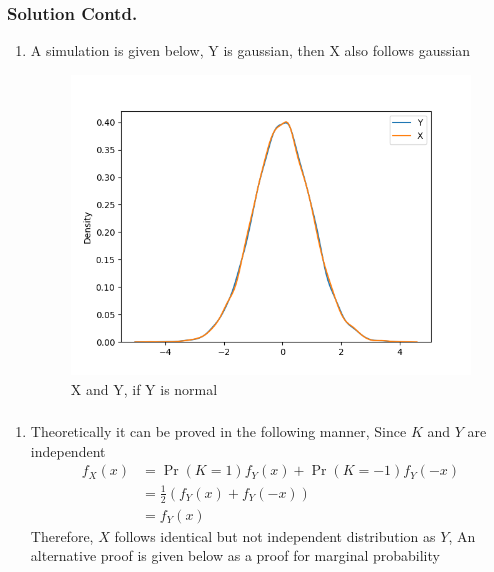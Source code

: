 \documentclass{beamer}
\providecommand{\pr}[1]{\ensuremath{\Pr\left(#1\right)}}
\providecommand{\brak}[1]{\ensuremath{\left(#1\right)}}
\begin{document}
\begin{frame}
\frametitle{Solution Contd.}
\begin{enumerate}
\item
A simulation is given below, Y is gaussian, then X also follows gaussian
\begin{figure}[H]
\centering
\includegraphics[width=.75\linewidth]{figure/fig}
\caption{X and Y, if Y is normal}
\label{plot}
\end{figure}
\end{enumerate}
\end{frame}

\begin{frame}
\frametitle{}
\begin{enumerate}\item
    Theoretically it can be proved in the following manner,
Since $K$ and $Y$ are independent
\begin{align}
f_X(x)&=\pr{K=1}f_Y(x)+\pr{K=-1}f_Y(-x)\\
&=\frac{1}{2}\brak{f_Y(x)+f_Y(-x)}\\
&=f_Y(x)
\end{align}
Therefore, $X$ follows identical but not independent distribution as $Y$, An alternative proof is given below as a proof for marginal probability
\end{enumerate}
\end{frame}
\end{document}
